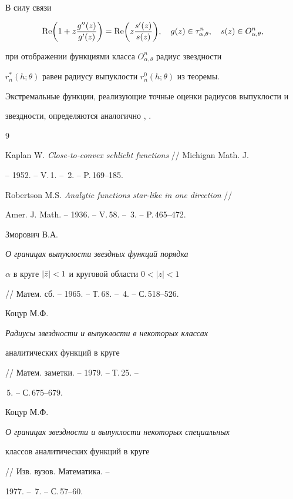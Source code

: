 В силу связи


$$


\re\biggl(1+z\frac{g''(z)}{g'(z)}\biggr)=\re\biggl(z


\frac{s'(z)}{s(z)}\biggr),\quad g(z)\in\tau^n_{\alpha,\theta},\quad


s(z)\in O^n_{\alpha,\theta},


$$


при отображении функциями класса $O^n_{\alpha,\theta}$ радиус звездности


$r^*_n(h;\theta)$ равен радиусу выпуклости $r^0_n(h;\theta)$ из теоремы.





Экстремальные функции, реализующие точные оценки радиусов выпуклости и


звездности, определяются аналогично \cite{Zm}, \cite{Ko2}.





\begin{thebibliography}{9}







Kaplan W. {\em Close-to-convex schlicht functions} // Michigan Math. J.


-- 1952. -- V.\,1. -- \No\,2. -- P.\,169--185.




Robertson M.S. {\em Analytic functions star-like in one direction} //


Amer. J. Math. -- 1936. -- V.\,58. -- \No\,3. -- P.\,465--472.




Зморович В.А. {\em О границах выпуклости звездных функций порядка


$\alpha$ в круге $|\Bar z|<1$ и круговой области $0<|z|<1$}


// Матем. сб. -- 1965. -- Т.\,68. -- \No\,4. -- С.\,518--526.




Коцур М.Ф. {\em Радиусы звездности и выпуклости в некоторых классах


аналитических функций в круге} // Матем. заметки. -- 1979. -- Т.\,25. --


\No\,5. -- С.\,675--679.




Коцур М.Ф. {\em О границах звездности и выпуклости некоторых специальных


классов аналитических функций в круге} // Изв. вузов. Математика. --


1977. -- \No\,7. -- С.\,57--60.








\end{thebibliography}





\vskip 2cm

















